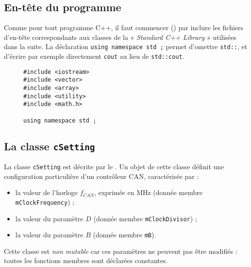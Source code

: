 \subsection{En-tête du programme}

Comme pour tout programme C++, il faut commencer () par inclure les fichiers d'en-tête correspondants aux classes de la « \emph{Standard C++ Library} » utilisées dans la suite. La déclaration \lstinline!using namespace std ;! permet d'omettre  \lstinline!std::!, et d'écrire par exemple directement  \lstinline!cout! au lieu de  \lstinline!std::cout!.

\begin{figure}[!ht]
\begin{lstlisting}
#include <iostream>
#include <vector>
#include <array>
#include <utility>
#include <math.h>

using namespace std ;
\end{lstlisting}
\end{figure}


\subsection{La classe \texttt{cSetting}}

La classe \texttt{cSetting} est décrite par le . Un objet de cette classe définit une configuration particulière d'un contrôleur CAN, caractérisée par :
\begin{itemize}
  \item la valeur de l'horloge $f_{CAN}$, exprimée en MHz (donnée membre \texttt{mClockFrequency}) ;
  \item la valeur du paramètre $D$ (donnée membre \texttt{mClockDivisor}) ;
  \item la valeur du paramètre $B$ (donnée membre \texttt{mB}).
\end{itemize}

Cette classe est \emph{non mutable} car ces paramètres ne peuvent pas être modifiés : toutes les fonctions membres sont déclarées constantes.

